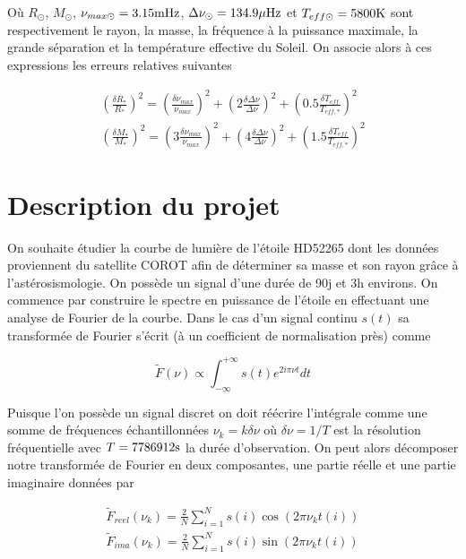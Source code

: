 \documentclass[a4paper,11pt]{article}
\numberwithin{equation}{section}
\begin{document}
Où $R_{\odot} $, $M_{\odot}$, $\nu_{max\odot} = 3.15 \rm mHz$, $\Delta \nu_{\odot} = 134.9 \rm \mu Hz$ et $T_{eff\odot} = 5800 \rm K$  sont respectivement le rayon, la masse, la fréquence à la puissance maximale, la grande séparation et la température effective du Soleil. On associe alors à ces expressions les erreurs relatives suivantes

\begin{gather}
\label{erreur}
\left ( \frac{\delta R_*}{R_*} \right )^2 = \left ( \frac{\delta \nu_{max}}{\nu_{max}} \right )^2 + \left ( 2 \frac{\delta \Delta \nu}{\Delta \nu} \right )^2 + \left ( 0.5 
\frac{\delta T_{eff}}{T_{eff,*}} \right )^2 \\
\label{erreur2}
\left ( \frac{\delta M_*}{M_*} \right )^2 = \left (3 \frac{\delta \nu_{max}}{\nu_{max}} \right )^2 + \left ( 4 \frac{\delta \Delta \nu}{\Delta \nu} \right )^2 + \left ( 1.5 \frac{\delta T_{eff}}{T_{eff,*}} \right )^2
\end{gather}

\section{Description du projet}
On souhaite étudier la courbe de lumière de l'étoile HD52265 dont les données proviennent du satellite COROT afin de déterminer sa masse et son rayon grâce à l'astérosismologie.
On possède un signal d'une durée de 90j et 3h environs. On commence par construire le spectre en puissance de l'étoile en effectuant une analyse de Fourier de la courbe. Dans le cas d'un signal continu $s(t)$ sa transformée de Fourier s'écrit\cite{Fourier} (à un coefficient de normalisation près) comme

\begin{equation}
\tilde F(\nu) \propto \int_{-\infty}^{+\infty} s(t) e^{2 i \pi \nu t} dt
\end{equation}

Puisque l'on possède un signal discret on doit réécrire l'intégrale comme une somme de fréquences échantillonnées\cite{DFT} $\nu_k = k \delta \nu$ où $\delta \nu = 1/T$ est la résolution fréquentielle avec $T = 7786912 \rm s$ la durée d'observation. On peut alors décomposer notre transformée de Fourier en deux composantes, une partie réelle et une partie imaginaire données par

\begin{gather}
\tilde F_{reel}(\nu_k) = \frac{2}{N} \sum\limits_{i=1}^N s(i) \cos(2\pi\nu_k t(i))\\
\tilde F_{ima}(\nu_k) = \frac{2}{N} \sum\limits_{i=1}^N s(i) \sin(2\pi\nu_k t(i))
\end{gather}
\end{document}
